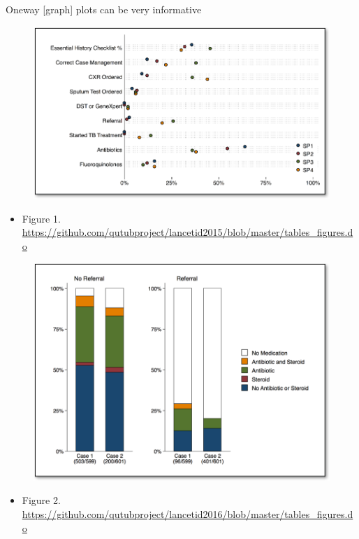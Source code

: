 \documentclass[aspectratio=169]{beamer}
\begin{document}
\begin{frame}[fragile]{Oneway [graph] plots can be very informative}
\begin{multicols}{2}	
	\begin{figure}
		\centering
		\includegraphics[width=\linewidth]{img/oneway1}
	\end{figure}
	\begin{itemize}
		\item Figure 1. \url{https://github.com/qutubproject/lancetid2015/blob/master/tables_figures.do}
	\end{itemize}

	\begin{figure}
		\centering
		\includegraphics[width=\linewidth]{img/oneway2}
	\end{figure}
	\begin{itemize}
		\item Figure 2. \url{https://github.com/qutubproject/lancetid2016/blob/master/tables_figures.do}
	\end{itemize}
\end{multicols}
\end{frame}
\end{document}
